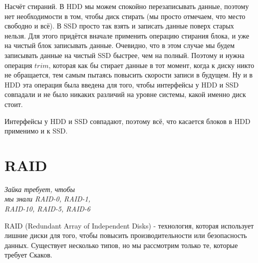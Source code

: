 \documentclass[12pt, a4paper]{article}
\begin{document}
Насчёт стираний. В HDD мы можем спокойно перезаписывать данные, поэтому нет необходимости в том, чтобы диск стирать (мы просто отмечаем, что место свободно и всё). В SSD просто так взять и записать данные поверх старых нельзя. Для этого придётся вначале применить операцию стирания блока, и уже на чистый блок записывать данные. Очевидно, что в этом случае мы будем записывать данные на чистый SSD быстрее, чем на полный. Поэтому и нужна операция $trim$, которая как бы стирает данные в тот момент, когда к диску никто не обращается, тем самым пытаясь повысить скорости записи в будущем. Ну и в HDD эта операция была введена для того, чтобы интерфейсы у HDD и SSD совпадали и не было никаких различий на уровне системы, какой именно диск стоит.

Интерфейсы у HDD и SSD совпадают, поэтому всё, что касается блоков в HDD применимо и к SSD.

\section{RAID}

\begin{flushright}
{\textit{Зайка требует, чтобы \\ мы знали RAID-0, RAID-1, \\ RAID-10, RAID-5, RAID-6}}
\end{flushright}

RAID (Redundant Array of Independent Disks) - технология, которая использует лишние диски для того, чтобы повысить производительности или безопасность данных. Существует несколько типов, но мы рассмотрим только те, которые требует Скаков.
\end{document}
